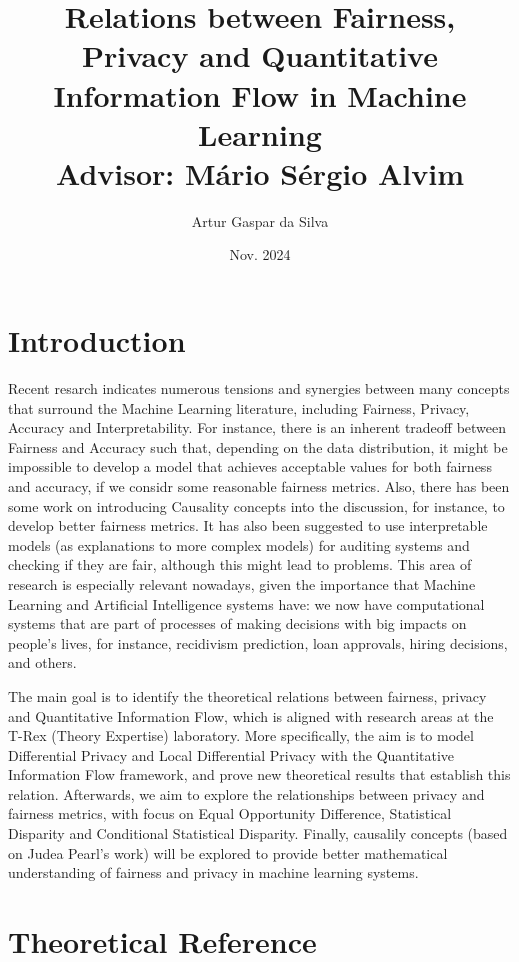 \documentclass[titlepage]{article}
\title{\Huge Relations between Fairness, Privacy and Quantitative Information Flow in Machine Learning\large\\ Advisor: Mário Sérgio Alvim}
\author{\Large Artur Gaspar da Silva}
\date{Nov. 2024}
\begin{document}
\maketitle
\pagebreak

\section{Introduction}

Recent resarch\cite{Sok}\cite{Reductions}\cite{Rachel}\cite{Awareness} indicates numerous tensions and synergies between many concepts that surround the Machine Learning literature, including Fairness, Privacy, Accuracy and Interpretability. For instance, there is an inherent tradeoff between Fairness and Accuracy such that, depending on the data distribution, it might be impossible to develop a model that achieves acceptable values for both fairness and accuracy, if we considr some reasonable fairness metrics\cite{Carlos}. Also, there has been some work on introducing Causality concepts into the discussion, for instance, to develop better fairness metrics\cite{CausalFair}. It has also been suggested to use interpretable models (as explanations to more complex models) for auditing systems and checking if they are fair, although this might lead to problems\cite{ExplainAll}. This area of research is especially relevant nowadays, given the importance that Machine Learning and Artificial Intelligence systems have: we now have computational systems that are part of processes of making decisions with big impacts on people's lives, for instance, recidivism prediction\cite{Compass}, loan approvals\cite{Loans}, hiring decisions\cite{Jobs}, and others.

The main goal is to identify the theoretical relations between fairness, privacy and Quantitative Information Flow, which is aligned with research areas at the T-Rex (Theory Expertise) laboratory. More specifically, the aim is to model Differential Privacy and Local Differential Privacy with the Quantitative Information Flow framework, and prove new theoretical results that establish this relation. Afterwards, we aim to explore the relationships between privacy and fairness metrics, with focus on Equal Opportunity Difference, Statistical Disparity and Conditional Statistical Disparity. Finally, causalily concepts (based on Judea Pearl's work\cite{Causality}) will be explored to provide better mathematical understanding of fairness and privacy in machine learning systems.

\section{Theoretical Reference}
\end{document}
